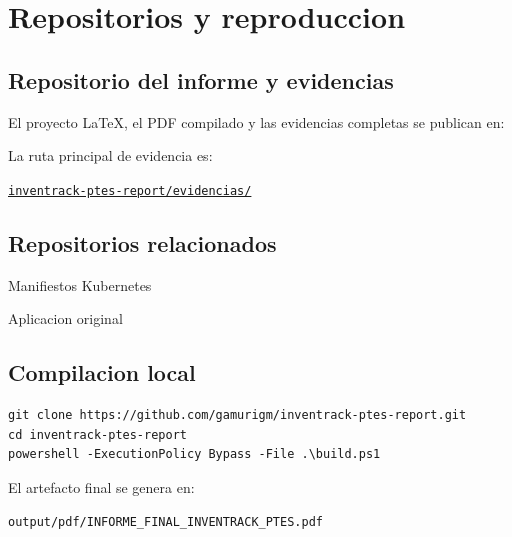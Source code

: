 \chapter{Repositorios y reproduccion}

\section{Repositorio del informe y evidencias}

El proyecto LaTeX, el PDF compilado y las evidencias completas se publican en:

\begin{center}
\Large\bfseries
\href{\ReportRepo}{\ReportRepo}
\end{center}

La ruta principal de evidencia es:

\begin{center}
\href{\ReportRepo/tree/main/evidencias}
{\nolinkurl{inventrack-ptes-report/evidencias/}}
\end{center}

\section{Repositorios relacionados}

\begin{description}
  \item[Manifiestos Kubernetes]
  \href{\KubernetesRepo}{\KubernetesRepo}

  \item[Aplicacion original]
  \href{\ApplicationRepo}{\ApplicationRepo}
\end{description}

\section{Compilacion local}

\begin{tcolorbox}[codebox]
\begin{Verbatim}[fontsize=\footnotesize,breaklines=true,breakanywhere=true]
git clone https://github.com/gamurigm/inventrack-ptes-report.git
cd inventrack-ptes-report
powershell -ExecutionPolicy Bypass -File .\build.ps1
\end{Verbatim}
\end{tcolorbox}

El artefacto final se genera en:

\begin{center}
\nolinkurl{output/pdf/INFORME_FINAL_INVENTRACK_PTES.pdf}
\end{center}
